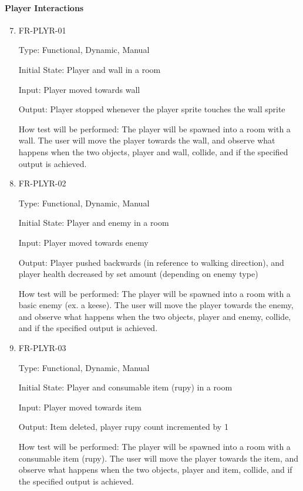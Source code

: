 \documentclass[12pt, titlepage]{article}
\begin{document}
\paragraph{Player Interactions} 

\begin{enumerate}
\setcounter{enumi}{6}	

\item{FR-PLYR-01\\}

Type: Functional, Dynamic, Manual

Initial State: Player and wall in a room

Input: Player moved towards wall

Output: Player stopped whenever the player sprite touches the wall sprite

How test will be performed: The player will be spawned into a room with a wall. The user will move the player towards the wall, and observe
what happens when the two objects, player and wall, collide, and if the specified output is achieved.

\item{FR-PLYR-02\\}

Type: Functional, Dynamic, Manual

Initial State: Player and enemy in a room

Input: Player moved towards enemy

Output: Player pushed backwards (in reference to walking direction), and player health decreased by set amount (depending on enemy type)

How test will be performed: The player will be spawned into a room with a basic enemy (ex. a keese). The user will move the player towards the enemy, and observe what happens when the two objects, player and enemy, collide, and if the specified output is achieved.

\item{FR-PLYR-03\\}

Type: Functional, Dynamic, Manual

Initial State: Player and consumable item (rupy) in a room

Input: Player moved towards item

Output: Item deleted, player rupy count incremented by 1

How test will be performed: The player will be spawned into a room with a consumable item (rupy). The user will move the player towards the item, and observe what happens when the two objects, player and item, collide, and if the specified output is achieved.


\end{enumerate}
\end{document}
